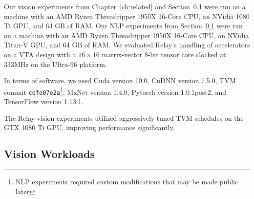   Our vision experiments from Chapter~\ref{ch:related} and Section~\ref{sec:perf-gpu} were run on a machine with an AMD Ryzen
    Threadripper 1950X 16-Core CPU,
    an NVidia 1080 Ti GPU,
    and 64 GB of RAM.
  Our NLP experiments from Section~\ref{sec:perf-gpu} were run on a machine with an AMD Ryzen
    Threadripper 1950X 16-Core CPU,
    an NVidia Titan-V GPU,
    and 64 GB of RAM.
  We evaluated Relay's handling of accelerators on a VTA design with a
    $16\times16$ matrix-vector 8-bit tensor core clocked at 333MHz on the Ultra-96 platform.

  In terms of software, we used
    Cuda version 10.0,
    CuDNN version 7.5.0,
    TVM commit \texttt{cefe07e2a}\footnote{NLP experiments required custom modifications that may be made public later},
    MxNet version 1.4.0,
    Pytorch version 1.0.1post2,
    and TensorFlow version 1.13.1.

  The Relay vision experiments utilized aggressively tuned TVM schedules on the GTX 1080 Ti GPU,
    improving performance significantly.

  \subsection{Vision Workloads}
  \label{sec:perf-gpu}

